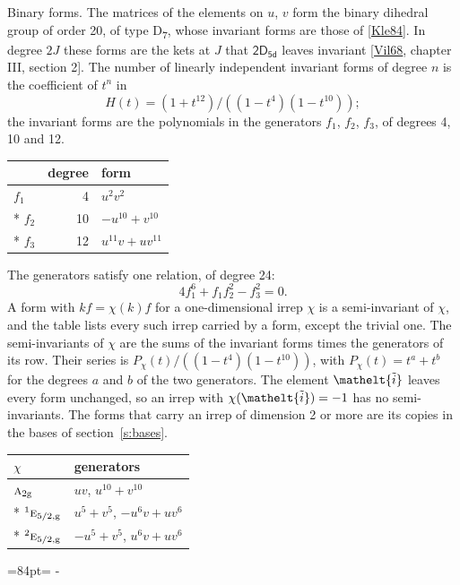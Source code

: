 \documentclass[10pt,a4paper]{article}
\makeatletter
\renewcommand\paragraph{\@startsection{paragraph}{4}{\z@}{1.5ex plus .5ex minus .2ex}{-1em}%
  {\normalfont\small\sffamily\bfseries\color{parttitle}}}
\newcommand{\needspace}[1]{\par\penalty-100\begingroup\dimen0=#1\relax\dimen2=\pagegoal
  \advance\dimen2-\pagetotal\ifdim\dimen0>\dimen2\relax\ifdim\dimen2>0pt\vfil\break\fi\fi
  \endgroup}
\numberwithin{equation}{section}
\newcommand{\eltfont}[1]{{\let\sigma\eltsigma\mathelt{#1}}}
\newcommand{\grp}[1]{\mathsf{#1}}
\newcommand{\irr}[1]{\text{\normalfont\scshape #1}}
\newcommand{\conjpair}[1]{{}^{#1}}
\newcommand{\elt}[1]{\eltfont{#1}}
\newcommand{\ptag}[1]{\mathrm{#1}}
\newcommand{\lift}[1]{\tilde{#1}}
\makeatother
\begin{document}
\paragraph{Binary forms.}
The matrices of the elements on $u$, $v$ form the binary dihedral group of order 20, of type D\textsubscript{7}, whose invariant forms are those of [\href{../../../REFERENCES.pdf\#ref.Kle84}{Kle84}]. In degree $2J$ these forms are the kets at $J$ that $\grp{2D_{5d}}$ leaves invariant [\href{../../../REFERENCES.pdf\#ref.Vil68}{Vil68}, chapter III, section 2]. \label{n:head.degree}\label{n:head.form}The number of linearly independent invariant forms of degree $n$ is the coefficient of $t^n$ in
\begin{equation}\label{e:molien}H(t) = (1 + t^{12})/((1-t^{4})(1-t^{10}));\end{equation}
the invariant forms are the polynomials in the generators $f_1$, $f_2$, $f_3$, of degrees 4, 10 and 12.
{\small\begin{longtable}{@{}lrl@{}}\toprule
& degree & form\\\midrule\endhead
\bottomrule\endfoot\endlastfoot
$f_{1}$ & 4 & $u^{2}v^{2}$\\*
$f_{2}$ & 10 & $-u^{10} + v^{10}$\\*
$f_{3}$ & 12 & $u^{11}v + uv^{11}$\\
\bottomrule\end{longtable}}
The generators satisfy one relation, of degree 24:
\begin{equation}\label{e:relation}4f_{1}^{6} + f_{1}f_{2}^{2} - f_{3}^{2} = 0.\end{equation}
A form with $k f = \chi(k) f$ for a one-dimensional irrep $\chi$ is a semi-invariant of $\chi$, and the table lists every such irrep carried by a form, except the trivial one. \label{n:head.generators}The semi-invariants of $\chi$ are the sums of the invariant forms times the generators of its row. Their series is $P_\chi(t)/((1-t^{4})(1-t^{10}))$, with $P_\chi(t) = t^{a} + t^{b}$ for the degrees $a$ and $b$ of the two generators. The element $\elt{\lift{i}}$ leaves every form unchanged, so an irrep with $\chi(\elt{\lift{i}}) = -1$ has no semi-invariants. The forms that carry an irrep of dimension 2 or more are its copies in the bases of section~\ref{s:bases}.
{\small\begin{longtable}{@{}ll@{}}\toprule
$\chi$ & generators\\\midrule\endhead
\bottomrule\endfoot\endlastfoot
$\irr{a}_{2\ptag{g}}$ & $uv$, $u^{10} + v^{10}$\\*
$\conjpair{1}\irr{e}_{5/2,\ptag{g}}$ & $u^{5} + v^{5}$, $-u^{6}v + uv^{6}$\\*
$\conjpair{2}\irr{e}_{5/2,\ptag{g}}$ & $-u^{5} + v^{5}$, $u^{6}v + uv^{6}$\\
\bottomrule\end{longtable}}
\needspace{84pt}
\end{document}

